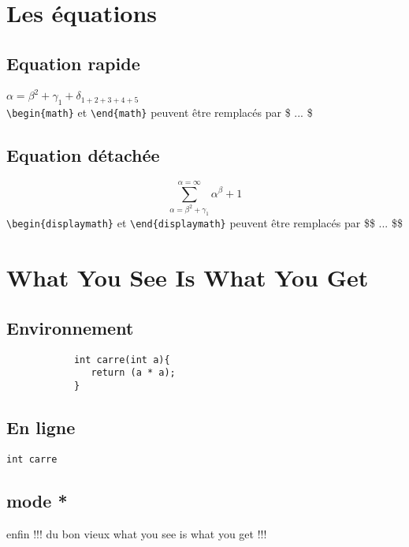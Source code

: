 \documentclass[francais, 10pt]{article}
\begin{document}
	\section{Les équations}
		\subsection{Equation rapide}
			\begin{math} \alpha = \beta^2 + \gamma_1 + \delta_{1 + 2 + 3 + 4 + 5} \end{math}
			\\
			\verb|\begin{math}| et \verb|\end{math}| peuvent être remplacés par \$ ... \$
		\subsection{Equation détachée}
			\begin{displaymath} \sum_{ \alpha = \beta^2 + \gamma_1 }^{  \alpha = \infty } {\alpha^\beta + 1}\end{displaymath}
			\verb|\begin{displaymath}| et \verb|\end{displaymath}| peuvent être remplacés par \$\$ ... \$\$
	
	\section{What You See Is What You Get}
		\subsection{Environnement}
		\begin{verbatim}
			int carre(int a){
			   return (a * a);
			}
		\end{verbatim}
	
		\subsection{En ligne}
			\verb+int carre+
	
		\subsection{mode *}
		\begin{verbatim*}
			enfin !!!        du bon vieux what you see is what you get !!!
		\end{verbatim*}
		
\end{document}
